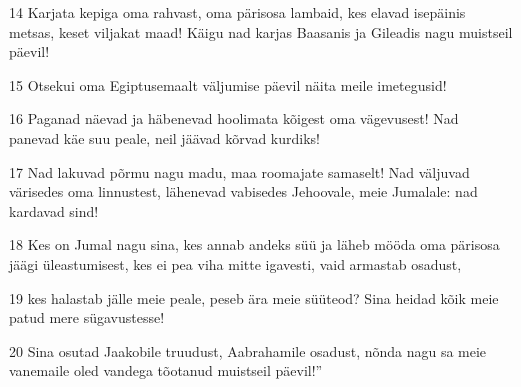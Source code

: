 \par 14 Karjata kepiga oma rahvast, oma pärisosa lambaid, kes elavad isepäinis metsas, keset viljakat maad! Käigu nad karjas Baasanis ja Gileadis nagu muistseil päevil!
\par 15 Otsekui oma Egiptusemaalt väljumise päevil näita meile imetegusid!
\par 16 Paganad näevad ja häbenevad hoolimata kõigest oma vägevusest! Nad panevad käe suu peale, neil jäävad kõrvad kurdiks!
\par 17 Nad lakuvad põrmu nagu madu, maa roomajate samaselt! Nad väljuvad värisedes oma linnustest, lähenevad vabisedes Jehoovale, meie Jumalale: nad kardavad sind!
\par 18 Kes on Jumal nagu sina, kes annab andeks süü ja läheb mööda oma pärisosa jäägi üleastumisest, kes ei pea viha mitte igavesti, vaid armastab osadust,
\par 19 kes halastab jälle meie peale, peseb ära meie süüteod? Sina heidad kõik meie patud mere sügavustesse!
\par 20 Sina osutad Jaakobile truudust, Aabrahamile osadust, nõnda nagu sa meie vanemaile oled vandega tõotanud muistseil päevil!”




